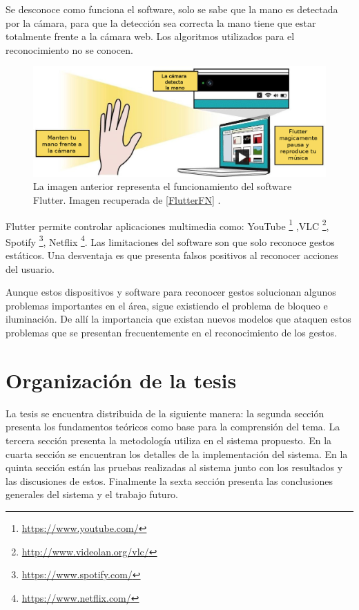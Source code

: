 Se desconoce como funciona el software, solo se sabe que la mano es detectada por la cámara, para que la detección sea correcta la mano tiene que estar totalmente frente a la cámara web. Los algoritmos utilizados para el reconocimiento no se conocen.  
\begin{figure}[h!]
\begin{center}
\includegraphics[scale=.4]{./Figures/Flutter.jpg}
\end{center}
\caption{La imagen anterior representa el funcionamiento del software Flutter. Imagen recuperada de \ref{FlutterFN} .}
\label{fig:Flutter}
\end{figure}

Flutter permite controlar aplicaciones multimedia como: YouTube \footnote{\url{https://www.youtube.com/}} ,VLC \footnote{\url{http://www.videolan.org/vlc/}}, Spotify \footnote{\url{https://www.spotify.com/}}, Netflix \footnote{\url{https://www.netflix.com/}}. Las limitaciones del software son que solo reconoce gestos estáticos. Una desventaja es que presenta falsos positivos al reconocer acciones del usuario.  


Aunque estos dispositivos y software para reconocer gestos solucionan algunos problemas importantes en el área, sigue existiendo el problema de bloqueo e iluminación.
De allí la importancia que existan nuevos modelos que ataquen estos problemas que se presentan frecuentemente en el reconocimiento de los gestos.
  
\section{Organizaci\'on de la tesis}\label{OrganizacionTesis}

La tesis se encuentra distribuida de la siguiente manera: la segunda sección presenta los fundamentos teóricos como base para la comprensión del tema. La tercera sección presenta la metodología utiliza en el sistema propuesto. En la cuarta sección se encuentran los detalles de la implementación del sistema. En la quinta sección están las pruebas realizadas al sistema junto con los resultados y las discusiones de estos. Finalmente la sexta sección presenta las conclusiones generales del sistema y el trabajo futuro. 

